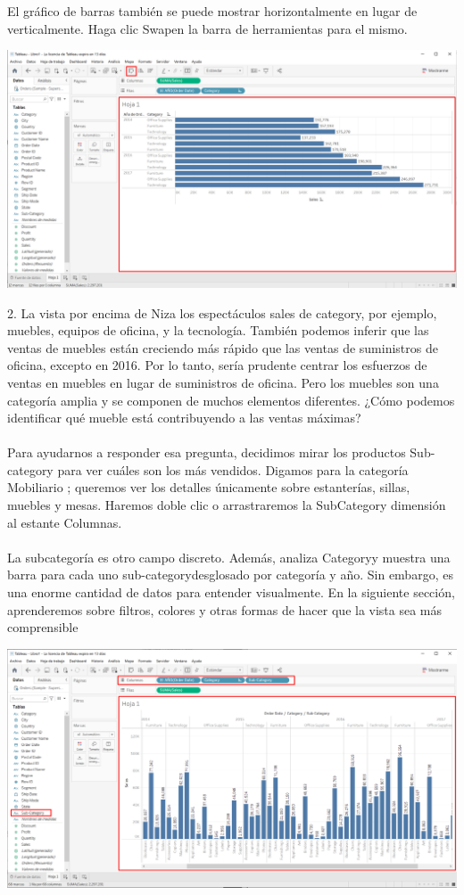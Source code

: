 \documentclass[12pt,letterpaper]{article}
\begin{document}
El gráfico de barras también se puede mostrar horizontalmente en lugar de verticalmente. Haga
clic Swapen la barra de herramientas para el mismo.
\begin{center}
    \includegraphics[width=16cm]{img/10.png}  
\end{center}
2. La vista por encima de Niza los espectáculos sales de category, por ejemplo, muebles, equipos
de oficina, y la tecnología. También podemos inferir que las ventas de muebles están creciendo más
rápido que las ventas de suministros de oficina, excepto en 2016. Por lo tanto, sería prudente centrar los
esfuerzos de ventas en muebles en lugar de suministros de oficina. Pero los muebles son una categoría
amplia y se componen de muchos elementos diferentes. ¿Cómo podemos identificar qué mueble está
contribuyendo a las ventas máximas?
\\\\Para ayudarnos a responder esa pregunta, decidimos mirar los productos Sub-category para ver
cuáles son los más vendidos. Digamos para la categoría Mobiliario ; queremos ver los detalles
únicamente sobre estanterías, sillas, muebles y mesas. Haremos doble clic o arrastraremos la SubCategory 
dimensión al estante Columnas.
\\\\La subcategoría es otro campo discreto. Además, analiza Categoryy muestra una barra para cada
uno sub-categorydesglosado por categoría y año. Sin embargo, es una enorme cantidad de datos
para entender visualmente. En la siguiente sección, aprenderemos sobre filtros, colores y otras formas
de hacer que la vista sea más comprensible
\begin{center}
    \includegraphics[width=16cm]{img/11.png}  
\end{center}
\end{document}
